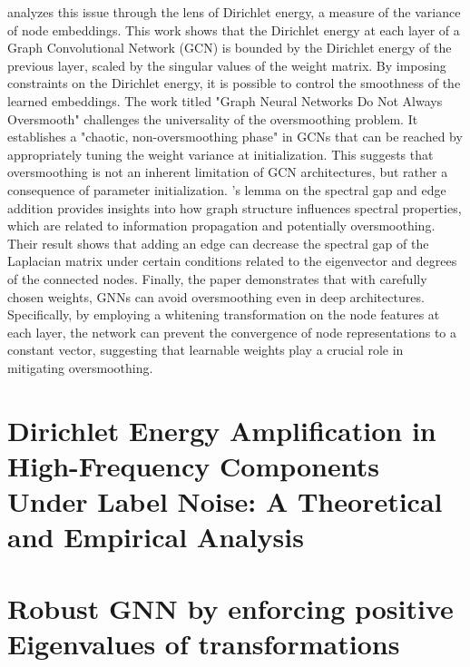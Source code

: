 \cite{zhou2021dirichlet} analyzes this issue through the lens of Dirichlet energy, a measure of the variance of node embeddings. This work shows that the Dirichlet energy at each layer of a Graph Convolutional Network (GCN) is bounded by the Dirichlet energy of the previous layer, scaled by the singular values of the weight matrix. By imposing constraints on the Dirichlet energy, it is possible to control the smoothness of the learned embeddings. The work titled "Graph Neural Networks Do Not Always Oversmooth" challenges the universality of the oversmoothing problem. It establishes a "chaotic, non-oversmoothing phase" in GCNs that can be reached by appropriately tuning the weight variance at initialization. This suggests that oversmoothing is not an inherent limitation of GCN architectures, but rather a consequence of parameter initialization. \cite{eldan2017braess}'s lemma on the spectral gap and edge addition provides insights into how graph structure influences spectral properties, which are related to information propagation and potentially oversmoothing. Their result shows that adding an edge can decrease the spectral gap of the Laplacian matrix under certain conditions related to the eigenvector and degrees of the connected nodes. Finally, the paper \cite{zhuo2024graph} demonstrates that with carefully chosen weights, GNNs can avoid oversmoothing even in deep architectures. Specifically, by employing a whitening transformation on the node features at each layer, the network can prevent the convergence of node representations to a constant vector, suggesting that learnable weights play a crucial role in mitigating oversmoothing.




\section{Dirichlet Energy Amplification in High-Frequency Components Under Label Noise: A Theoretical and Empirical Analysis}
 \label{sec:Amplification}


\section{Robust GNN by enforcing positive Eigenvalues of transformations }
